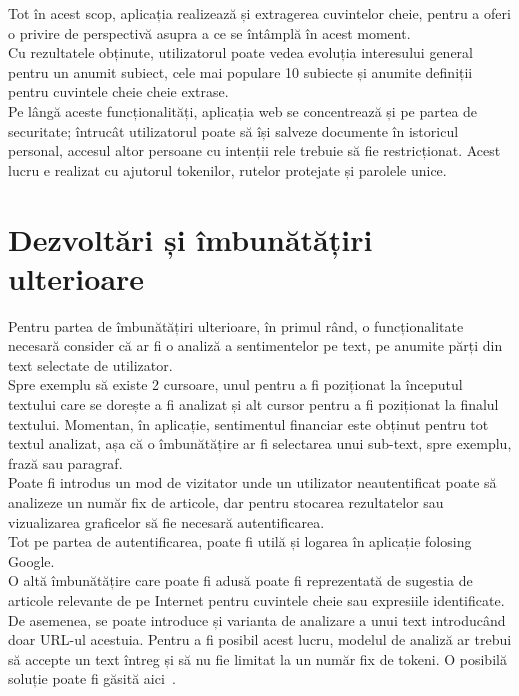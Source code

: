 Tot în acest scop, aplicația realizează și extragerea cuvintelor cheie, pentru a oferi o privire de perspectivă asupra a ce se întâmplă în acest moment.\\
Cu rezultatele obținute, utilizatorul poate vedea evoluția interesului general pentru un anumit subiect, cele mai populare 10 subiecte și anumite definiții pentru cuvintele cheie cheie extrase.\\

Pe lângă aceste funcționalități, aplicația web se concentrează și pe partea de securitate; întrucât utilizatorul poate să își salveze documente în istoricul personal, accesul altor persoane cu intenții rele trebuie să fie restricționat.
Acest lucru e realizat cu ajutorul tokenilor, rutelor protejate și parolele unice.

\newpage

\section{Dezvoltări și îmbunătățiri ulterioare}
Pentru partea de îmbunătățiri ulterioare, în primul rând, o funcționalitate necesară consider că ar fi o analiză a sentimentelor pe text, pe anumite părți din text selectate de utilizator.\\
Spre exemplu să existe 2 cursoare, unul pentru a fi poziționat la începutul textului care se dorește a fi analizat și alt cursor pentru a fi poziționat la finalul textului. 
Momentan, în aplicație, sentimentul financiar este obținut pentru tot textul analizat, așa că o îmbunătățire ar fi selectarea unui sub-text, spre exemplu, frază sau paragraf.\\

Poate fi introdus un mod de vizitator unde un utilizator neautentificat poate să analizeze un număr fix de articole, dar pentru stocarea rezultatelor sau vizualizarea graficelor să fie necesară autentificarea. \\
Tot pe partea de autentificarea, poate fi utilă și logarea în aplicație folosing Google.\\

O altă îmbunătățire care poate fi adusă poate fi reprezentată de sugestia de articole relevante de pe Internet pentru cuvintele cheie sau expresiile identificate.\\

De asemenea, se poate introduce și varianta de analizare a unui text introducând doar URL-ul acestuia. Pentru a fi posibil acest lucru, modelul de analiză ar trebui să accepte
un text întreg și să nu fie limitat la un număr fix de tokeni. O posibilă soluție poate fi găsită aici~\cite{TransformersLongText}.